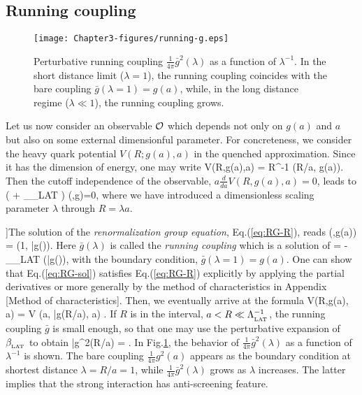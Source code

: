 \subsection{Running coupling}

\begin{figure}[t]
\begin{center}
\texttt{[image: Chapter3-figures/running-g.eps]} 
 \end{center}
\caption{Perturbative running coupling $\frac{1}{4\pi}\bar{g}^2(\lambda)$ as a function of $\lambda^{-1}$.
In the short distance limit ($\lambda =1$), the running coupling coincides with the bare coupling $\bar{g}(\lambda=1)=g(a)$,
while, in the long distance regime ($\lambda \ll 1$), the running coupling grows. }
\label{fig:running-g}
\end{figure}


Let us now consider an observable ${\cal O}$ which depends 
not only on $g(a)$ and $a$ but also on some external dimensionful parameter.
For concreteness, we consider the heavy quark potential $V(R; g(a),a)$ in the 
quenched approximation.  Since it has the dimension of energy, one may write
\beq
V(R,g(a),a) = R^{-1}  (R/a, g(a)).
\eeq
Then the cutoff independence of the observable, $a \frac{d}{da}V(R,g(a),a)=0$,  leads to
\beq
\left( \lambda \frac{\partial}{\partial \lambda} + \beta_{_{\rm LAT}}  \right)  (\lambda,g)=0,
\label{eq:RG-R}
\eeq
where we have introduced 
a dimensionless  scaling parameter $\lambda$ through $R=\lambda a$.

]The solution of the {\it renormalization group equation}, Eq.(\ref{eq:RG-R}), reads
\beq
\label{eq:RG-sol}
  (\lambda,g(a)) =  (1, \bar{g}(\lambda)).
 \eeq
 Here $\bar{g}(\lambda)$ is called the {\it running coupling} which is  a solution of
\beq
\lambda {}  = - \beta_{_{\rm LAT}} (\bar{g}(\lambda)),
\eeq
with the boundary condition, $\bar{g}(\lambda=1)= g(a)$.
One can show that  Eq.(\ref{eq:RG-sol})  satisfies Eq.(\ref{eq:RG-R}) explicitly by applying the partial derivatives 
 or more generally by the method of characteristics in Appendix [Method of characteristics].
Then, we eventually arrive at the formula 
\beq
V(R,g(a), a) =  V (a, \bar{g}(R/a), a) .
\eeq
If $R$ is  in the interval,  $a < R \ll \Lambda_{_{\rm LAT}}^{-1}$, the running coupling $\bar{g}$ is small enough, so that 
one may use the perturbative expansion of $\beta_{_{\rm LAT}}$ to obtain
\beq
\bar{g}^2(R/a) \simeq {} =  . 
\label{eq:running-R}
\eeq 
In Fig.\ref{fig:running-g}, the behavior of $\frac{1}{4\pi}\bar{g}^2(\lambda)$  as a function of $\lambda^{-1}$ is shown.
The bare coupling $\frac{1}{4\pi}g^2(a)$ appears as the boundary condition at shortest distance $\lambda=R/a=1$,
while $\frac{1}{4\pi} \bar{g}^2(\lambda)$ grows  as $\lambda$ increases.
The latter implies that the strong interaction has anti-screening feature.


